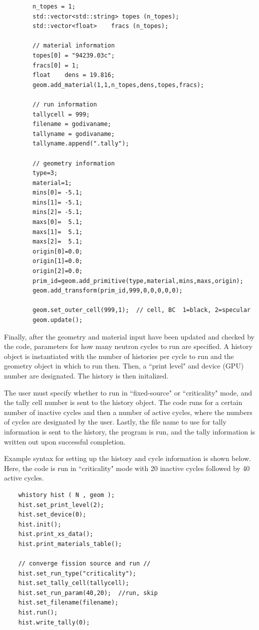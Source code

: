 \documentclass[twoside,a4paper]{refart}
\begin{document}
\begin{verbatim}
		n_topes = 1;
		std::vector<std::string> topes (n_topes);
		std::vector<float>    fracs (n_topes);

		// material information
		topes[0] = "94239.03c";
		fracs[0] = 1;      
		float    dens = 19.816;
		geom.add_material(1,1,n_topes,dens,topes,fracs);
		
		// run information
		tallycell = 999;
		filename = godivaname;
		tallyname = godivaname;
		tallyname.append(".tally");
	
		// geometry information
		type=3;
		material=1;
		mins[0]= -5.1;
		mins[1]= -5.1;
		mins[2]= -5.1;
		maxs[0]=  5.1;
		maxs[1]=  5.1;
		maxs[2]=  5.1;
		origin[0]=0.0;
		origin[1]=0.0;
		origin[2]=0.0;
		prim_id=geom.add_primitive(type,material,mins,maxs,origin);
		geom.add_transform(prim_id,999,0,0,0,0,0);

		geom.set_outer_cell(999,1);  // cell, BC  1=black, 2=specular
		geom.update();
\end{verbatim}

Finally, after the geometry and material input have been updated and checked by the code, parameters for how many neutron cycles to run are specified. A history object is instantiated with the number of
histories per cycle to run and the geometry object in which to run then. Then, a ``print level" and 
device (GPU) number are designated. The history is then initalized.

The user must specify whether to run in ``fixed-source" or ``criticality" mode, and the tally cell number
is sent to the history object. The code runs for a certain number of inactive cycles and then a number of
active cycles, where the numbers of cycles are designated by the user. Lastly, the file name to use for
tally information is sent to the history, the program is run, and the tally information is written out
upon successful completion.

Example syntax for setting up the history and cycle information is shown below. Here, the code is run in
``criticality" mode with 20 inactive cycles followed by 40 active cycles.

\begin{verbatim}
	whistory hist ( N , geom );
	hist.set_print_level(2);
	hist.set_device(0);
	hist.init();
	hist.print_xs_data();
	hist.print_materials_table();

	// converge fission source and run //
	hist.set_run_type("criticality");
	hist.set_tally_cell(tallycell);
	hist.set_run_param(40,20);  //run, skip
	hist.set_filename(filename);
	hist.run();
	hist.write_tally(0);
\end{verbatim}
\end{document}
